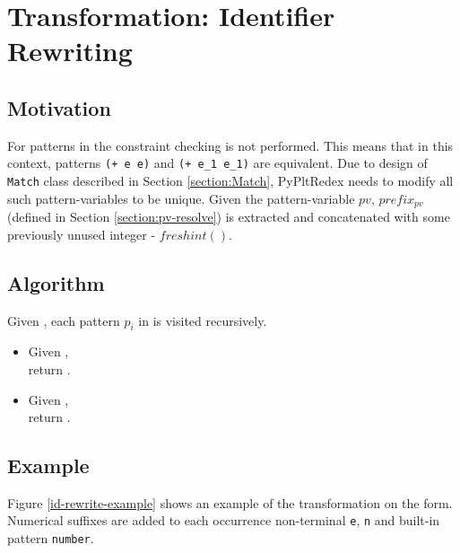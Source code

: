 \section{Transformation: Identifier Rewriting}
\label{section:id-rewrite}

\subsection{Motivation}

For patterns in the \DefineLanguageNoArg \space constraint checking is not performed. This means that in this context, patterns \texttt{(+ e e)} and \texttt{(+ e\_1 e\_1)} are equivalent. Due to design of \texttt{Match} class described in Section \ref{section:Match}, PyPltRedex needs to modify all such pattern-variables to be unique. Given the pattern-variable $pv$, $\mathit{prefix_{pv}}$ (defined in Section \ref{section:pv-resolve}) is extracted and concatenated with some previously unused integer - $\mathit{freshint()}$.

\subsection{Algorithm}
Given , each pattern $p_i$ in \NtDefinitionN \space is visited recursively.
\begin{itemize}
\item Given \BuiltInPattern, \\ return .
\item Given \NonTerminal, \\ return .
\end{itemize}

\subsection{Example}

Figure \ref{id-rewrite-example} shows an example of the transformation on the \DefineLanguage form. Numerical suffixes are added to each occurrence non-terminal \texttt{e}, \texttt{n} and built-in pattern \texttt{number}.


